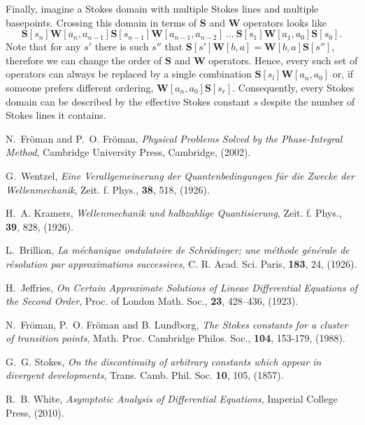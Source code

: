 \documentclass[atmp]{ipart_v1}
\def\S{\bm{S}}
\def\W{\bm{W}}
\begin{document}
Finally, imagine a Stokes domain with multiple Stokes lines and multiple basepoints. Crossing this 
domain in terms of $\S$ and $\W$ operators looks like
\begin{equation}
\S[s_n]\W[a_n,a_{n-1}]\S[s_{n-1}]\W[a_{n-1},a_{n-2}]\ ...\ \S[s_1]\W[a_1,a_0]\S[s_0].
\end{equation}
Note that for any $s'$ there is such $s''$ that $\S[s']\W[b,a]=\W[b,a]\S[s'']$, therefore
we can change the order of $\S$ and $\W$ operators. Hence,
every such set of operators can always be replaced by a single combination $\S[s_l] \W[a_n,a_0]$ or, 
if someone prefers different ordering, $\W[a_n,a_0] \S[s_r]$. Consequently, every Stokes domain can 
be described by the effective Stokes constant $s$ despite the number of Stokes lines it contains.


\begin{thebibliography}{30}

N.~Fr\"oman and P.~O. Fr\"oman, 
\textit{Physical Problems Solved by the Phase-Integral Method}, 
Cambridge University Press, Cambridge, (2002).

 G.~Wentzel, 
\textit{Eine Verallgemeinerung der Quantenbedingungen f\"ur die Zwecke der Wellenmechanik},
Zeit. f. Phys., \textbf{38}, 518, (1926).

 H.~A. Kramers, 
\textit{Wellenmechanik und halbzahlige Quantisierung},
Zeit. f. Phys., \textbf{39}, 828, (1926).

 L.~Brillion, 
\textit{La m\'echanique ondulatoire de Schr\"odinger; une m\'ethode
g\'en\'erale de r\'esolution par approximations successives},
C. R. Acad. Sci. Paris, \textbf{183}, 24, (1926).

 H.~Jeffries, 
\textit{On Certain Approximate Solutions of Lineae Differential Equations of the Second Order},
Proc. of London Math. Soc., \textbf{23}, 428–436, (1923).

 N.~Fr\"oman, P.~O. Fr\"oman and B. Lundborg, 
\textit{The Stokes constants for a cluster of transition points}, 
Math. Proc. Cambridge Philos. Soc., \textbf{104}, 153-179, (1988).

 G.~G. Stokes, 
\textit{On the discontinuity of arbitrary constants which appear in divergent developments},
Trans. Camb. Phil. Soc. \textbf{10}, 105, (1857).

 R.~B. White,
\textit{Asymptotic Analysis of Differential Equations}, 
Imperial College Press, (2010).


\end{thebibliography}
\end{document}
